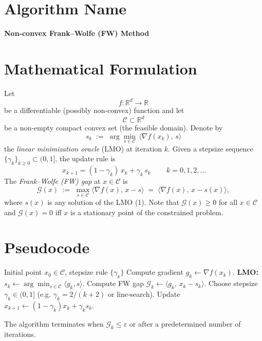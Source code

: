\documentclass{article}
\newcommand{\gap}{\mathcal{G}}
\newcommand{\R}{\mathbb{R}}
\begin{document}
\section*{Algorithm Name}
\textbf{Non‑convex Frank–Wolfe (FW) Method}

\section*{Mathematical Formulation}
Let 
\[
f:\R^{d}\rightarrow\R
\]
be a differentiable (possibly non‑convex) function and let 
\[
\mathcal C\subset\R^{d}
\]
be a non‑empty compact convex set (the feasible domain).  
Denote by 
\[
\displaystyle s_{k}\;:=\;\arg\min_{s\in\mathcal C}\,\langle \nabla f(x_{k}),\,s\rangle
\tag{1}
\]
the \emph{linear minimization oracle} (LMO) at iteration $k$.  
Given a stepsize sequence $\{\gamma_{k}\}_{k\ge 0}\subset (0,1]$, the update rule is
\[
\boxed{\,x_{k+1}= (1-\gamma_{k})\,x_{k}+ \gamma_{k}\,s_{k}\,}\qquad k=0,1,2,\dots
\tag{2}
\]
The \emph{Frank–Wolfe (FW) gap} at $x\in\mathcal C$ is
\[
\gap(x)\;:=\;\max_{s\in\mathcal C}\langle \nabla f(x),\,x-s\rangle 
          \;=\;\langle \nabla f(x),\,x-s(x)\rangle,
\tag{3}
\]
where $s(x)$ is any solution of the LMO (1).  Note that $\gap(x)\ge 0$ for all $x\in\mathcal C$ and $\gap(x)=0$ iff $x$ is a stationary point of the constrained problem.

\section*{Pseudocode}
\begin{algorithm}[H]
\caption{Non‑convex Frank–Wolfe}
\label{alg:FW}
\begin{algorithmic}[1]
\REQUIRE Initial point $x_{0}\in\mathcal C$, stepsize rule $\{\gamma_{k}\}$ 
    \STATE Compute gradient $g_{k}\gets\nabla f(x_{k})$.
    \STATE \textbf{LMO:} $s_{k}\gets\arg\min_{s\in\mathcal C}\langle g_{k},s\rangle$.
    \STATE Compute FW gap $\gap_{k}\gets\langle g_{k},\,x_{k}-s_{k}\rangle$.
    \STATE Choose stepsize $\gamma_{k}\in(0,1]$ (e.g. $\gamma_{k}=2/(k+2)$ or line‑search).
    \STATE Update $x_{k+1}\gets (1-\gamma_{k})x_{k}+ \gamma_{k}s_{k}$.
\ENDFOR
\end{algorithmic}
\end{algorithm}
The algorithm terminates when $\gap_{k}\le\varepsilon$ or after a predetermined number of iterations.
\end{document}
